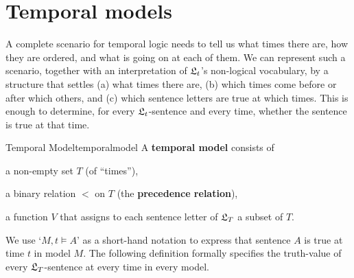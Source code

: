 \section{Temporal models}

A complete scenario for temporal logic needs to tell us what times there are,
how they are ordered, and what is going on at each of them. We can represent
such a scenario, together with an interpretation of $\mathfrak{L}_{t}$'s non-logical
vocabulary, by a structure that settles (a) what times there are, (b) which
times come before or after which others, and (c) which sentence letters are true
at which times. This is enough to determine, for every $\mathfrak{L}_{t}$-sentence and
every time, whether the sentence is true at that time.

\begin{definition}{Temporal Model}{temporalmodel}
  A \textbf{temporal model} consists of
  \vspace{-3mm}
  \begin{itemize*}
  \item a non-empty set $T$ (of ``times''),
  \item a binary relation $<$ on $T$ (the \textbf{precedence relation}),
  \item a function $V$ that assigns to each sentence letter of $\mathfrak{L}_T$
    a subset of $T$.
  \end{itemize*}
\end{definition}


We use `$M, t \models A$' as a short-hand notation to express that sentence $A$
is true at time $t$ in model $M$. The following definition formally specifies
the truth-value of every $\mathfrak{L}_T$-sentence at every time in every model.

